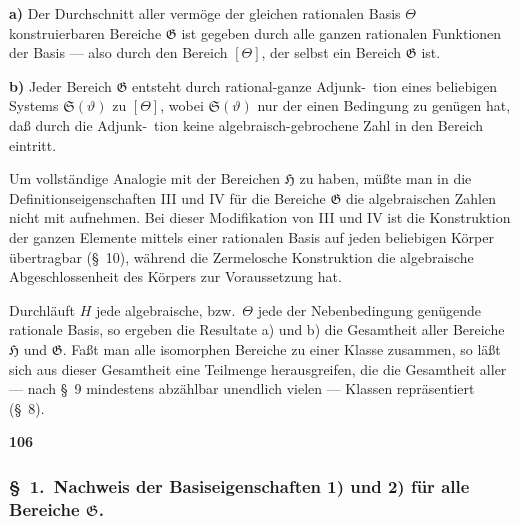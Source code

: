 \documentclass[12pt,a4paper]{article}
\begin{document}
\smallskip
\textbf{a)} Der Durchschnitt aller verm\"oge der gleichen rationalen Basis $\Theta$ konstruierbaren Bereiche $\mathfrak{G}$ ist gegeben durch alle ganzen rationalen Funktionen der Basis --- also durch den Bereich $[\Theta]$, der selbst ein Bereich $\mathfrak{G}$ ist.

\smallskip
\textbf{b)} Jeder Bereich $\mathfrak{G}$ entsteht durch rational-ganze Adjunk-\ tion eines beliebigen Systems $\mathfrak{S}(\vartheta)$ zu $[\Theta]$, wobei $\mathfrak{S}(\vartheta)$ nur der einen Bedingung zu gen\"ugen hat, da\ss{} durch die Adjunk-\ tion keine algebraisch-gebrochene Zahl in den Bereich eintritt.

Um vollst\"andige Analogie mit der Bereichen $\mathfrak{H}$ zu haben, m\"u\ss te man in die Definitionseigenschaften III und IV f\"ur die Bereiche $\mathfrak{G}$ die algebraischen Zahlen nicht mit aufnehmen. Bei dieser Modifikation von III und IV ist die Konstruktion der ganzen Elemente mittels einer rationalen Basis auf jeden beliebigen K\"orper \"ubertragbar (\S\ 10), w\"ahrend die Zermelosche Konstruktion die algebraische Abgeschlossenheit des K\"orpers zur Voraussetzung hat.

Durchl\"auft $H$ jede algebraische, bzw.\ $\Theta$ jede der Nebenbedingung gen\"ugende rationale Basis, so ergeben die Resultate a) und b) die Gesamtheit aller Bereiche $\mathfrak{H}$ und $\mathfrak{G}$. Fa\ss t man alle isomorphen Bereiche zu einer Klasse zusammen, so l\"a\ss t sich aus dieser Gesamtheit eine Teilmenge herausgreifen, die die Gesamtheit aller --- nach \S\ 9 mindestens abz\"ahlbar unendlich vielen --- Klassen repr\"asentiert (\S\ 8).

\newpage
\begin{center}
\textbf{106}
\end{center}

\subsubsection*{\S\ 1.\ Nachweis der Basiseigenschaften 1) und 2) f\"ur alle Bereiche $\mathfrak{G}$.}
\end{document}
